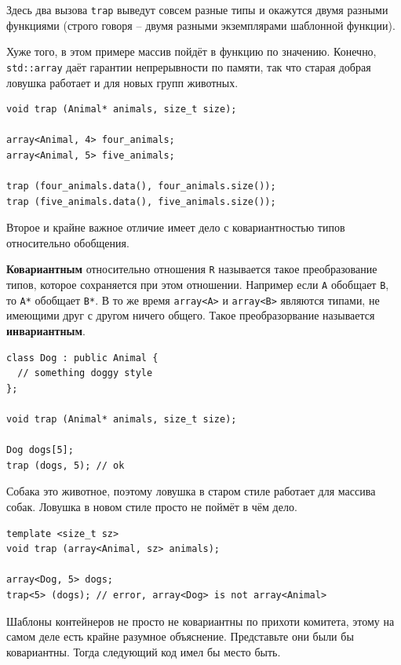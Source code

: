 \documentclass[a4paper,12pt,oneside]{article}
\begin{document}
Здесь два вызова \lstinline!trap! выведут совсем разные типы и окажутся двумя разными функциями (строго говоря -- двумя разными экземплярами шаблонной функции).

Хуже того, в этом примере массив пойдёт в функцию по значению. Конечно, \lstinline!std::array! даёт гарантии непрерывности по памяти, так что старая добрая ловушка работает и для новых групп животных.

\begin{lstlisting}
void trap (Animal* animals, size_t size);

array<Animal, 4> four_animals;
array<Animal, 5> five_animals;

trap (four_animals.data(), four_animals.size());
trap (five_animals.data(), five_animals.size());
\end{lstlisting}

Второе и крайне важное отличие имеет дело с ковариантностью типов относительно обобщения.

\textbf{Ковариантным} относительно отношения \lstinline!R! называется такое преобразование типов, которое сохраняется при этом отношении. Например если \lstinline!A! обобщает \lstinline!B!, то \lstinline!A*! обобщает \lstinline!B*!. В то же время \lstinline!array<A>! и \lstinline!array<B>! являются типами, не имеющими друг с другом ничего общего. Такое преобразорвание называется \textbf{инвариантным}.

\begin{lstlisting}
class Dog : public Animal { 
  // something doggy style
};

void trap (Animal* animals, size_t size);

Dog dogs[5];
trap (dogs, 5); // ok
\end{lstlisting}

Собака это животное, поэтому ловушка в старом стиле работает для массива собак. Ловушка в новом стиле просто не поймёт в чём дело.

\begin{lstlisting}
template <size_t sz> 
void trap (array<Animal, sz> animals);

array<Dog, 5> dogs;
trap<5> (dogs); // error, array<Dog> is not array<Animal>
\end{lstlisting}

Шаблоны контейнеров не просто не ковариантны по прихоти комитета, этому на самом деле есть крайне разумное объяснение. Представьте они были бы ковариантны. Тогда следующий код имел бы место быть.
\end{document}
